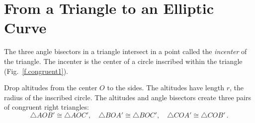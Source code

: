 \section{From a Triangle to an Elliptic Curve}\label{s.elliptic}

The three angle bisectors in a triangle intersect in a point called the \emph{incenter} of the triangle. The incenter is the center of a circle inscribed within the triangle  (Fig.~\ref{f.congruent1}). 

Drop altitudes from the center $O$ to the sides. The altitudes have length $r$, the radius of the inscribed circle. The altitudes and angle bisectors create three pairs of congruent right triangles:
\[
\triangle AOB'\cong \triangle AOC',\quad \triangle BOA'\cong \triangle BOC',\quad \triangle COA'\cong \triangle COB'\,.
\]


